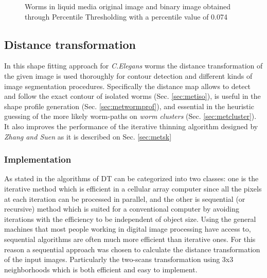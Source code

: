 \begin{figure}[h t b p ! H]
  \centering
\qquad
\caption{Worms in liquid media original image and binary image obtained through
Percentile Thresholding with a percentile value of 0.074}
  \label{fig:wormthres}
\end{figure}

\subsection{Distance transformation}
\label{sec:metdt}

In this shape fitting approach for \emph{C.Elegans} worms the distance transformation
of the given image is used thoroughly for contour detection and different kinds of image 
segmentation procedures. Specifically the distance map allows to detect and follow
the exact contour of isolated worms (Sec. \ref{sec:metiso}), 
is useful in the shape profile generation (Sec. \ref{sec:metwormprof}), and essential in the heuristic
guessing of the more likely worm-paths on \emph{worm clusters} (Sec. \ref{sec:metcluster}).
It also improves the performance of the iterative thinning algorithm designed by 
\emph{Zhang and Suen} \cite{thinning} as it is described on Sec. \ref{sec:metsk}

\subsubsection{Implementation}
\label{sec:dtimp}

 As stated in \cite[p.196]{fastdt} the algorithms of DT can be categorized into two classes: one is the iterative 
 method which is efficient in a cellular array computer since all the pixels at each iteration can be processed in parallel, and the other 
is sequential (or recursive) method which is suited for a conventional computer by
 avoiding iterations with the efficiency to be independent of object size. 
Using the general machines that most people working in digital image processing
 have access to, sequential algorithms are often much more efficient than
 iterative ones. For this reason a sequential approach was chosen to calculate the
distance transformation of the input images. Particularly the two-scans transformation
using 3x3 neighborhoods \cite{fastdt} which is both efficient and easy to implement.\\

